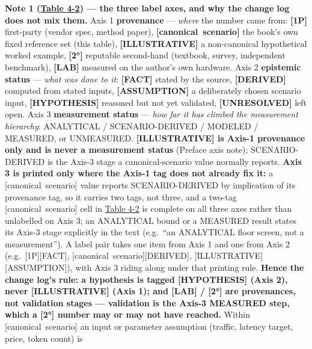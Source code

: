 \textbf{Note 1 (\hyperref[tab:4.2]{Table 4-2}) --- the three label axes, and why the change
log does not mix them.} Axis 1 \textbf{provenance} --- \emph{where} the
number came from: \textbf{\mbox{{[}1P{]}}} first-party (vendor spec, method
paper), \textbf{\mbox{{[}canonical scenario{]}}} the book's own fixed reference
set (this table), \textbf{\mbox{{[}ILLUSTRATIVE{]}}} a non-canonical
hypothetical worked example, \textbf{\mbox{{[}2°{]}}} reputable second-hand
(textbook, survey, independent benchmark), \textbf{\mbox{{[}LAB{]}}} measured
on the author's own hardware. Axis 2 \textbf{epistemic status} ---
\emph{what was done to it}: \textbf{\mbox{{[}FACT{]}}} stated by the source,
\textbf{\mbox{{[}DERIVED{]}}} computed from stated inputs,
\textbf{\mbox{{[}ASSUMPTION{]}}} a deliberately chosen scenario input,
\textbf{\mbox{{[}HYPOTHESIS{]}}} reasoned but not yet validated,
\textbf{\mbox{{[}UNRESOLVED{]}}} left open. Axis 3 \textbf{measurement status}
--- \emph{how far it has climbed the measurement hierarchy}: ANALYTICAL
/ SCENARIO-DERIVED / MODELED / MEASURED, or UNMEASURED.
\textbf{\mbox{{[}ILLUSTRATIVE{]}} is Axis-1 provenance only and is never a
measurement status} (Preface axis note); SCENARIO-DERIVED is the Axis-3
stage a canonical-scenario value normally reports. \textbf{Axis 3 is
printed only where the Axis-1 tag does not already fix it:} a
\mbox{{[}canonical scenario{]}} value reports SCENARIO-DERIVED by implication
of its provenance tag, so it carries two tags, not three, and a two-tag
\mbox{{[}canonical scenario{]}} cell in \hyperref[tab:4.2]{Table 4-2} is complete on all three axes
rather than unlabelled on Axis 3; an ANALYTICAL bound or a MEASURED
result states its Axis-3 stage explicitly in the text (e.g.~``an
ANALYTICAL floor screen, not a measurement''). A label pair takes one
item from Axis 1 and one from Axis 2 (e.g.~\mbox{{[}1P{]}}\hspace{0pt}\mbox{{[}FACT{]}},
\mbox{{[}canonical scenario{]}}\hspace{0pt}\mbox{{[}DERIVED{]}},
\mbox{{[}ILLUSTRATIVE{]}}\hspace{0pt}\mbox{{[}ASSUMPTION{]}}), with Axis 3 riding along under that
printing rule. \textbf{Hence the change log's rule: a hypothesis is
tagged \mbox{{[}HYPOTHESIS{]}} (Axis 2), never \mbox{{[}ILLUSTRATIVE{]}} (Axis 1); and
\mbox{{[}LAB{]}} / \mbox{{[}2°{]}} are provenances, not validation stages ---
validation is the Axis-3 MEASURED step, which a \mbox{{[}2°{]}} number may or
may not have reached.} Within \mbox{{[}canonical scenario{]}} an input or
parameter assumption (traffic, latency target, price, token count) is
